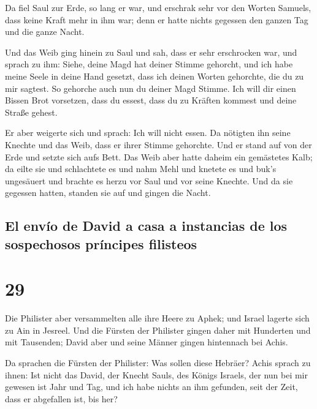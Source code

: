  Da fiel Saul zur Erde, so lang er war, und erschrak sehr
vor den Worten Samuels, dass keine Kraft mehr in ihm war; denn er hatte
nichts gegessen den ganzen Tag und die ganze Nacht.

 Und das Weib ging hinein zu Saul und sah, dass er sehr
erschrocken war, und sprach zu ihm: Siehe, deine Magd hat deiner Stimme
gehorcht, und ich habe meine Seele in deine Hand gesetzt, dass ich
deinen Worten gehorchte, die du zu mir sagtest.  So
gehorche auch nun du deiner Magd Stimme. Ich will dir einen Bissen Brot
vorsetzen, dass du essest, dass du zu Kräften kommest und deine Straße
gehest.

 Er aber weigerte sich und sprach: Ich will nicht essen.
Da nötigten ihn seine Knechte und das Weib, dass er ihrer Stimme
gehorchte. Und er stand auf von der Erde und setzte sich aufs Bett.
 Das Weib aber hatte daheim ein gemästetes Kalb; da eilte
sie und schlachtete es und nahm Mehl und knetete es und buk's ungesäuert
 und brachte es herzu vor Saul und vor seine Knechte. Und
da sie gegessen hatten, standen sie auf und gingen die Nacht.

\hypertarget{el-envuxedo-de-david-a-casa-a-instancias-de-los-sospechosos-pruxedncipes-filisteos}{%
\subsection{El envío de David a casa a instancias de los sospechosos
príncipes
filisteos}\label{el-envuxedo-de-david-a-casa-a-instancias-de-los-sospechosos-pruxedncipes-filisteos}}

\hypertarget{section-28}{%
\section{29}\label{section-28}}

 Die Philister aber versammelten alle ihre Heere zu Aphek;
und Israel lagerte sich zu Ain in Jesreel.  Und die
Fürsten der Philister gingen daher mit Hunderten und mit Tausenden;
David aber und seine Männer gingen hintennach bei Achis.

 Da sprachen die Fürsten der Philister: Was sollen diese
Hebräer? Achis sprach zu ihnen: Ist nicht das David, der Knecht Sauls,
des Königs Israels, der nun bei mir gewesen ist Jahr und Tag, und ich
habe nichts an ihm gefunden, seit der Zeit, dass er abgefallen ist, bis
her?

